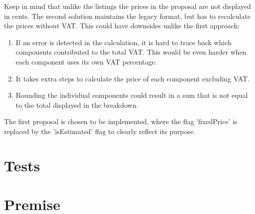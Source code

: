 Keep in mind that unlike the listings the prices in the proposal are not displayed in cents. The second solution maintains the legacy format, but has to recalculate the prices without VAT. This could have downsides unlike the first approach:

\begin{enumerate}
	\item If an error is detected in the calculation, it is hard to trace back which components contributed to the total VAT. This would be even harder when each component uses its own VAT percentage.
	\item It takes extra steps to calculate the price of each component excluding VAT.
	\item Rounding the individual components could result in a sum that is not equal to the total displayed in the breakdown.
\end{enumerate}

The first proposal is chosen to be implemented, where the flag 'fixedPrice' is replaced by the 'isEstimated' flag to clearly reflect its purpose.

%
\section{Tests}

%
\section{Premise}


